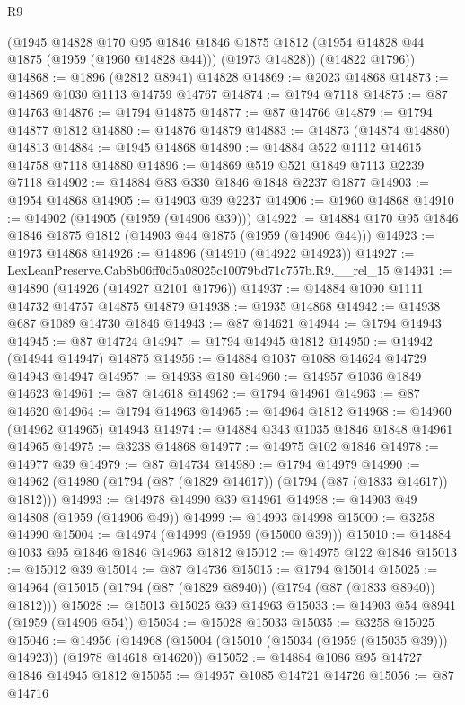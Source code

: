 \begin{lexlean}{R9}
\begin{coremodule}
      (@1945
        @14828
        @170
        @95
        @1846
        @1846
        @1875
        @1812
        (@1954 @14828 @44 @1875 (@1959 (@1960 @14828 @44)))
        (@1973 @14828))
      (@14822 @1796))
@14868 := @1896 (@2812 @8941) @14828
@14869 := @2023 @14868
@14873 := @14869 @1030 @1113 @14759 @14767
@14874 := @1794 @7118
@14875 := @87 @14763
@14876 := @1794 @14875
@14877 := @87 @14766
@14879 := @1794 @14877 @1812
@14880 := @14876 @14879
@14883 := @14873 (@14874 @14880) @14813
@14884 := @1945 @14868
@14890 := @14884 @522 @1112 @14615 @14758 @7118 @14880
@14896 := @14869 @519 @521 @1849 @7113 @2239 @7118
@14902 := @14884 @83 @330 @1846 @1848 @2237 @1877
@14903 := @1954 @14868
@14905 := @14903 @39 @2237
@14906 := @1960 @14868
@14910 := @14902 (@14905 (@1959 (@14906 @39)))
@14922 := @14884 @170 @95 @1846 @1846 @1875 @1812 (@14903 @44 @1875 (@1959 (@14906 @44)))
@14923 := @1973 @14868
@14926 := @14896 (@14910 (@14922 @14923))
@14927 := LexLeanPreserve.Cab8b06ff0d5a08025c10079bd71c757b.R9.__rel_15
@14931 := @14890 (@14926 (@14927 @2101 @1796))
@14937 := @14884 @1090 @1111 @14732 @14757 @14875 @14879
@14938 := @1935 @14868
@14942 := @14938 @687 @1089 @14730 @1846
@14943 := @87 @14621
@14944 := @1794 @14943
@14945 := @87 @14724
@14947 := @1794 @14945 @1812
@14950 := @14942 (@14944 @14947) @14875
@14956 := @14884 @1037 @1088 @14624 @14729 @14943 @14947
@14957 := @14938 @180
@14960 := @14957 @1036 @1849 @14623
@14961 := @87 @14618
@14962 := @1794 @14961
@14963 := @87 @14620
@14964 := @1794 @14963
@14965 := @14964 @1812
@14968 := @14960 (@14962 @14965) @14943
@14974 := @14884 @343 @1035 @1846 @1848 @14961 @14965
@14975 := @3238 @14868
@14977 := @14975 @102 @1846
@14978 := @14977 @39
@14979 := @87 @14734
@14980 := @1794 @14979
@14990 := @14962 (@14980 (@1794 (@87 (@1829 @14617)) (@1794 (@87 (@1833 @14617)) @1812)))
@14993 := @14978 @14990 @39 @14961
@14998 := @14903 @49 @14808 (@1959 (@14906 @49))
@14999 := @14993 @14998
@15000 := @3258 @14990
@15004 := @14974 (@14999 (@1959 (@15000 @39)))
@15010 := @14884 @1033 @95 @1846 @1846 @14963 @1812
@15012 := @14975 @122 @1846
@15013 := @15012 @39
@15014 := @87 @14736
@15015 := @1794 @15014
@15025 := @14964 (@15015 (@1794 (@87 (@1829 @8940)) (@1794 (@87 (@1833 @8940)) @1812)))
@15028 := @15013 @15025 @39 @14963
@15033 := @14903 @54 @8941 (@1959 (@14906 @54))
@15034 := @15028 @15033
@15035 := @3258 @15025
@15046 := @14956
    (@14968 (@15004 (@15010 (@15034 (@1959 (@15035 @39))) @14923)) (@1978 @14618 @14620))
@15052 := @14884 @1086 @95 @14727 @1846 @14945 @1812
@15055 := @14957 @1085 @14721 @14726
@15056 := @87 @14716

\end{coremodule}
\end{lexlean}
